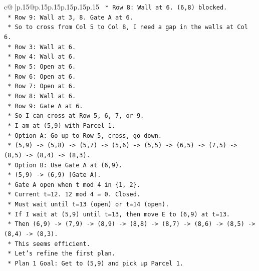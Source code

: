 \documentclass{article}
\begin{document}
{\begin{supertabular}{c@{$\;$}|p{.15\linewidth}@{}p{.15\linewidth}p{.15\linewidth}p{.15\linewidth}p{.15\linewidth}p{.15\linewidth}}
{{{\texttt{                *   Row 8: Wall at 6. (6,8) blocked.} \\
\texttt{                *   Row 9: Wall at 3, 8. Gate A at 6.} \\
\texttt{                *   So to cross from Col 5 to Col 8, I need a gap in the walls at Col 6.} \\
\texttt{                *   Row 3: Wall at 6.} \\
\texttt{                *   Row 4: Wall at 6.} \\
\texttt{                *   Row 5: Open at 6.} \\
\texttt{                *   Row 6: Open at 6.} \\
\texttt{                *   Row 7: Open at 6.} \\
\texttt{                *   Row 8: Wall at 6.} \\
\texttt{                *   Row 9: Gate A at 6.} \\
\texttt{                *   So I can cross at Row 5, 6, 7, or 9.} \\
\texttt{                *   I am at (5,9) with Parcel 1.} \\
\texttt{                *   Option A: Go up to Row 5, cross, go down.} \\
\texttt{                    *   (5,9) {-}> (5,8) {-}> (5,7) {-}> (5,6) {-}> (5,5) {-}> (6,5) {-}> (7,5) {-}> (8,5) {-}> (8,4) {-}> (8,3).} \\
\texttt{                *   Option B: Use Gate A at (6,9).} \\
\texttt{                    *   (5,9) {-}> (6,9) {[}Gate A{]}.} \\
\texttt{                    *   Gate A open when t mod 4 in \{1, 2\}.} \\
\texttt{                    *   Current t=12. 12 mod 4 = 0. Closed.} \\
\texttt{                    *   Must wait until t=13 (open) or t=14 (open).} \\
\texttt{                    *   If I wait at (5,9) until t=13, then move E to (6,9) at t=13.} \\
\texttt{                    *   Then (6,9) {-}> (7,9) {-}> (8,9) {-}> (8,8) {-}> (8,7) {-}> (8,6) {-}> (8,5) {-}> (8,4) {-}> (8,3).} \\
\texttt{                    *   This seems efficient.} \\
\texttt{            *   Let's refine the first plan.} \\
\texttt{            *   Plan 1 Goal: Get to (5,9) and pick up Parcel 1.} \\
}}}
\end{supertabular}}
\end{document}

